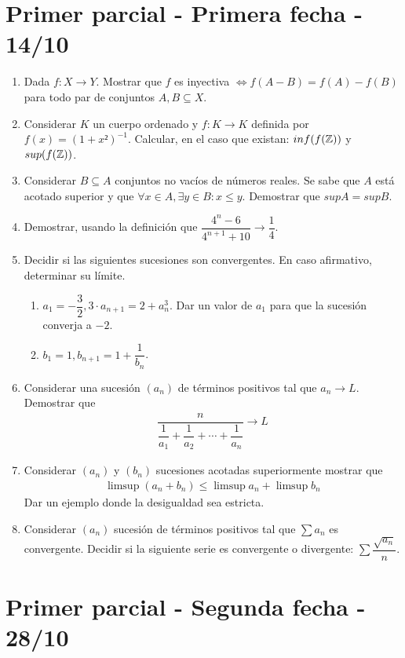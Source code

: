 \section{Primer parcial - Primera fecha - 14/10}

\begin{enumerate}
  \item Dada $f: X \to Y$. Mostrar que $f$ es inyectiva $\iff f(A-B) = f(A) - f(B)$ para todo par de conjuntos $A, B \subseteq X$.
  \item Considerar $K$ un cuerpo ordenado y $f: K \to K$ definida por $f(x) = (1+x²)^{-1}$. Calcular, en el caso que existan: $inf(f(\mathbb{Z}))$ y $sup(f(\mathbb{Z}))$.
  \item Considerar $B \subseteq A$ conjuntos no vacíos de números reales. Se sabe que $A$ está acotado superior y que $\forall x \in A, \exists y \in B : x \leq y$. Demostrar que $sup A = sup B$.
  \item Demostrar, usando la definición que $\dfrac{4^n - 6}{4^{n+1}+10} \to \dfrac{1}{4}$.
  \item Decidir si las siguientes sucesiones son convergentes. En caso afirmativo, determinar su límite. \begin{enumerate}
          \item $a_1 = -\dfrac{3}{2}, 3 \cdot a_{n+1} = 2 + a_n^3$. Dar un valor de $a_1$ para que la sucesión converja a $-2$.
          \item $b_1 = 1, b_{n+1} = 1 + \dfrac{1}{b_n}$.
        \end{enumerate}
  \item Considerar una sucesión $(a_n)$ de términos positivos tal que $a_n \to L$. Demostrar que \begin{align*} \dfrac{n}{\dfrac{1}{a_1} + \dfrac{1}{a_2} + \cdots + \dfrac{1}{a_n}} \to L \end{align*}
  \item Considerar $(a_n)$ y $(b_n)$ sucesiones acotadas superiormente mostrar que \begin{align*} \limsup(a_n + b_n) \leq \limsup a_n + \limsup b_n \end{align*} Dar un ejemplo donde la desigualdad sea estricta.
  \item Considerar $(a_n)$ sucesión de términos positivos tal que $\sum a_n$ es convergente. Decidir si la siguiente serie es convergente o divergente: $\sum \dfrac{\sqrt{a_n}}{n}$.
\end{enumerate}

\clearpage

\section{Primer parcial - Segunda fecha - 28/10}

